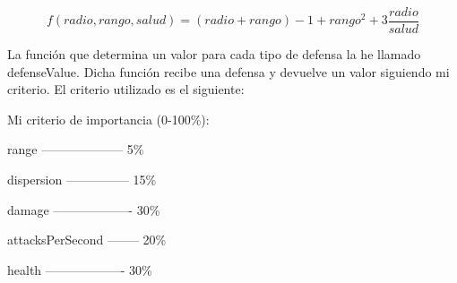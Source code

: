 $$ f(radio,rango,salud)=(radio+rango)-1+rango^2+3\frac{radio}{salud} $$

La función que determina un valor para cada tipo de defensa la he llamado defenseValue.
Dicha función recibe una defensa y devuelve un valor siguiendo mi criterio.
El criterio utilizado es el siguiente:

Mi criterio de importancia (0-100\%):

range -------------------- 5\%

dispersion --------------- 15\%

damage ------------------- 30\%

attacksPerSecond  -------- 20\%

health ------------------- 30\%
